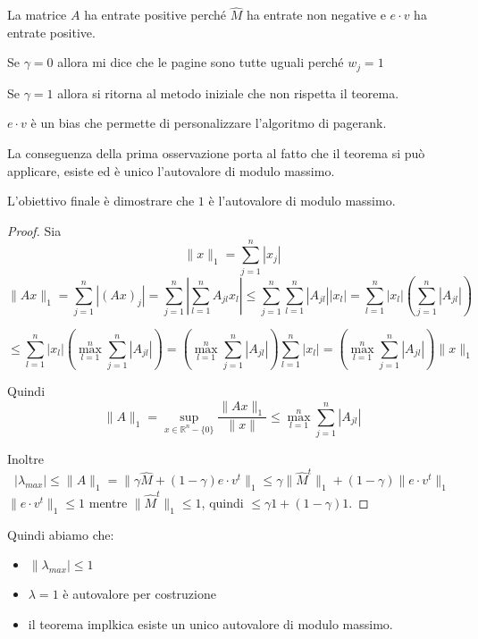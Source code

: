 \begin{nota}
    La matrice $A$ ha entrate positive perché $\hat{M}$ ha entrate non negative e 
    $e\cdot v$ ha entrate positive. 
\end{nota}
\begin{nota}
    Se $\gamma = 0$ allora mi dice che le pagine sono tutte uguali perché $w_j = 1$

    Se $\gamma = 1$ allora si ritorna al metodo iniziale che non rispetta il teorema. 
\end{nota}

$e\cdot v$ è un bias che permette di personalizzare l'algoritmo di pagerank.

La conseguenza della prima osservazione porta al fatto che il teorema si può applicare, 
esiste ed è unico l'autovalore di modulo massimo.

L'obiettivo finale è dimostrare che $1$ è l'autovalore di modulo massimo.
\begin{proof}
    Sia $$\|x\|_1 = \sum_{j=1}^n |x_j|$$ 
    $$\|Ax\|_1 = \sum_{j=1}^n |(Ax)_j| = \sum_{j=1}^n|\sum_{l=1}^nA_{jl}x_l|\le \sum_{j=1}^n\sum_{l=1}^n|A_{jl}||x_l| =  \sum_{l=1}^n|x_l|(\sum_{j=1}^n|A_{jl}|)$$

    $$\le  \sum_{l=1}^n|x_l|(\max_{l=1}^n\sum_{j=1}^n|A_{jl}|) = (\max_{l=1}^n\sum_{j=1}^n|A_{jl}|) \sum_{l=1}^n|x_l| = (\max_{l=1}^n\sum_{j=1}^n|A_{jl}|) \|x\|_1 $$

    Quindi $$\|A\|_1 = \sup_{x\in \mathbb{R}^n - \{0\}} \frac{\|Ax\|_1}{\|x\|}\le \max_{l=1}^n\sum_{j=1}^n|A_{jl}|$$

    Inoltre 
    $$|\lambda_{max}| \le \|A\|_1 = \|\gamma \hat{M} + (1-\gamma) e \cdot v^t\|_1 \le \gamma \|\hat{M}^t\|_1 + (1-\gamma) \|e \cdot v^t\|_1$$
    $\|e \cdot v^t\|_1\le 1$  mentre $\|\hat{M}^t\|_1\le 1$, quindi $\le \gamma 1 + (1-\gamma) 1$.

\end{proof}

Quindi abiamo che:
\begin{itemize}
    \item $\|\lambda_{max} | \le 1$
    \item $\lambda = 1$ è autovalore per costruzione 
    \item il teorema implkica esiste un unico autovalore di modulo massimo.
\end{itemize}

